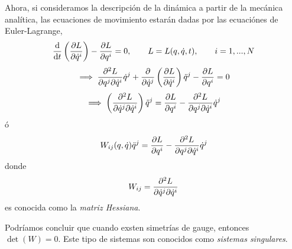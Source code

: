 Ahora, si consideramos la descripción de la dinámica a partir de la mecánica analítica, las ecuaciones de movimiento estarán dadas por las ecuaciónes de Euler-Lagrange,
\begin{equation}
  \dv{t}\left(\pdv{L}{\dot{q}^{i}}\right)-\pdv{L}{q^{i}}=0,\qquad L=L(q,\dot{q},t),\qquad i=1,...,N
\end{equation}
\begin{equation}
  \implies \pdv{L}{q^j}{\dot{q}^{i}}\dot{q}^j+\pdv{\dot{q}^j}\left(\pdv{L}{\dot{q}^{i}}\right)\ddot{q}^j-\pdv{L}{q^{i}}=0
\end{equation}
\begin{equation}
  \implies \left(\pdv{L}{\dot{q}^j}{\dot{q}^{i}}\right)\ddot{q}^j=\pdv{L}{q^{i}}-\pdv{L}{q^j}{\dot{q}^{i}}\dot{q}^j 
\end{equation}
ó
\begin{equation}
 W_{ij}(q,\dot{q} )\ddot{q}^j=\pdv{L}{q^{i}}-\pdv{L}{q^j}{\dot{q}^{i}}\dot{q}^j 
\end{equation}
donde
\begin{equation}
  W_{ij}=\pdv{L}{\dot{q}^j}{\dot{q}^{i}}
\end{equation}
es conocida como la \textit{matriz Hessiana}.

Podríamos concluir que cuando exsten simetrías de gauge, entonces $\det (W)=0$. Este tipo de sistemas son conocidos como \textit{sistemas singulares}.


